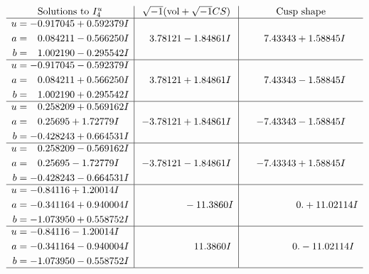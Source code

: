 \documentclass[1p]{elsarticle_modified}
\theoremstyle{definition}
\newcommand{\I}{\sqrt{-1}}
\begin{document}
$$\begin{array}{c|c|c}  
\text{Solutions to }I^u_{4}& \I (\text{vol} + \sqrt{-1}CS) & \text{Cusp shape}\\
 \hline 
\begin{aligned}
u &= -0.917045 + 0.592379 I \\
a &= \phantom{-}0.084211 - 0.566250 I \\
b &= \phantom{-}1.002190 - 0.295542 I\end{aligned}
 & \phantom{-}3.78121 - 1.84861 I & \phantom{-}7.43343 + 1.58845 I \\ \hline\begin{aligned}
u &= -0.917045 - 0.592379 I \\
a &= \phantom{-}0.084211 + 0.566250 I \\
b &= \phantom{-}1.002190 + 0.295542 I\end{aligned}
 & \phantom{-}3.78121 + 1.84861 I & \phantom{-}7.43343 - 1.58845 I \\ \hline\begin{aligned}
u &= \phantom{-}0.258209 + 0.569162 I \\
a &= \phantom{-}0.25695 + 1.72779 I \\
b &= -0.428243 + 0.664531 I\end{aligned}
 & -3.78121 + 1.84861 I & -7.43343 - 1.58845 I \\ \hline\begin{aligned}
u &= \phantom{-}0.258209 - 0.569162 I \\
a &= \phantom{-}0.25695 - 1.72779 I \\
b &= -0.428243 - 0.664531 I\end{aligned}
 & -3.78121 - 1.84861 I & -7.43343 + 1.58845 I \\ \hline\begin{aligned}
u &= -0.84116 + 1.20014 I \\
a &= -0.341164 + 0.940004 I \\
b &= -1.073950 + 0.558752 I\end{aligned}
 & \phantom{-0.000000 } -11.3860 I & \phantom{-0.000000 -}0. + 11.02114 I \\ \hline\begin{aligned}
u &= -0.84116 - 1.20014 I \\
a &= -0.341164 - 0.940004 I \\
b &= -1.073950 - 0.558752 I\end{aligned}
 & \phantom{-0.000000 -}11.3860 I & \phantom{-0.000000 } 0. - 11.02114 I\\
 \hline 
 \end{array}$$\newpage
\end{document}
